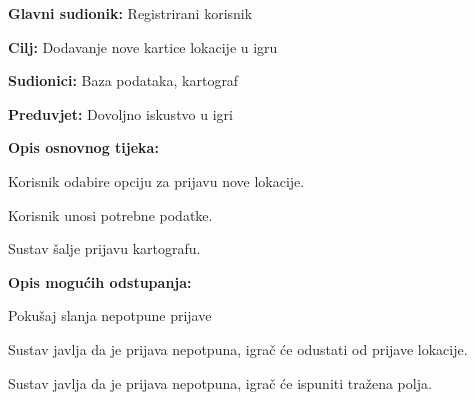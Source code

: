 				\noindent {}
				\begin{packed_item}
					
					\item \textbf{Glavni sudionik: }Registrirani korisnik
					\item  \textbf{Cilj:} Dodavanje nove kartice lokacije u igru
					\item  \textbf{Sudionici:} Baza podataka, kartograf
					\item  \textbf{Preduvjet:} Dovoljno iskustvo u igri
					\item  \textbf{Opis osnovnog tijeka:}
					
					\item[] \begin{packed_enum}
						
						\item Korisnik odabire opciju za prijavu nove lokacije.
						\item Korisnik unosi potrebne podatke.
						\item Sustav šalje prijavu kartografu.
					\end{packed_enum}
					\item  \textbf{Opis mogućih odstupanja:}
					
					\item[] \begin{packed_item}
						
						\item[1.a] Pokušaj slanja nepotpune prijave
						\item[] \begin{packed_enum}
							
							\item  Sustav javlja da je prijava nepotpuna, igrač će odustati od prijave lokacije. 
							\item  Sustav javlja da je prijava nepotpuna, igrač će ispuniti tražena polja.
							
						\end{packed_enum}
						
					\end{packed_item}
				\end{packed_item}
				
